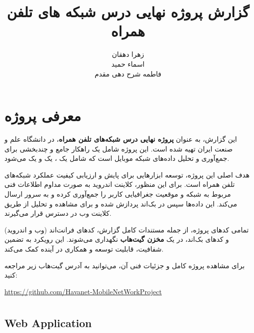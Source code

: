 \documentclass{report}
\title{گزارش پروژه نهایی درس شبکه های تلفن همراه}
\author{زهرا دهقان\\اسماء حمید\\فاطمه شرح دهی مقدم}
\begin{document}
\Godpage
\maketitle
{}
\tableofcontents

\chapter{معرفی پروژه}

این گزارش، به عنوان \textbf{پروژه نهایی درس شبکه‌های تلفن همراه}، در دانشگاه علم و صنعت ایران تهیه شده است.
این پروژه شامل یک راهکار جامع و چندبخشی برای جمع‌آوری و تحلیل داده‌های شبکه موبایل است که شامل یک 
، یک  و یک  می‌شود. 

هدف اصلی این پروژه، توسعه ابزارهایی برای پایش و ارزیابی کیفیت عملکرد شبکه‌های تلفن همراه است. 
برای این منظور، کلاینت اندروید به صورت مداوم اطلاعات فنی مربوط به شبکه و موقعیت جغرافیایی کاربر را جمع‌آوری کرده و به سرور ارسال می‌کند. 
این داده‌ها سپس در بک‌اند پردازش شده و برای مشاهده و تحلیل از طریق کلاینت وب در دسترس قرار می‌گیرند.

تمامی کدهای پروژه، از جمله مستندات کامل گزارش، کدهای فرانت‌اند (وب و اندروید) و کدهای بک‌اند، در یک \textbf{مخزن گیت‌هاب} نگهداری می‌شوند. 
این رویکرد به تضمین شفافیت، قابلیت توسعه و همکاری در آینده کمک می‌کند.

برای مشاهده پروژه کامل و جزئیات فنی آن، می‌توانید به آدرس گیت‌هاب زیر مراجعه کنید:

\begin{center}
	\url{https://github.com/Havanet-MobileNetWorkProject}
\end{center}


\chapter{ }

\section{{Web Application}}
\end{document}
